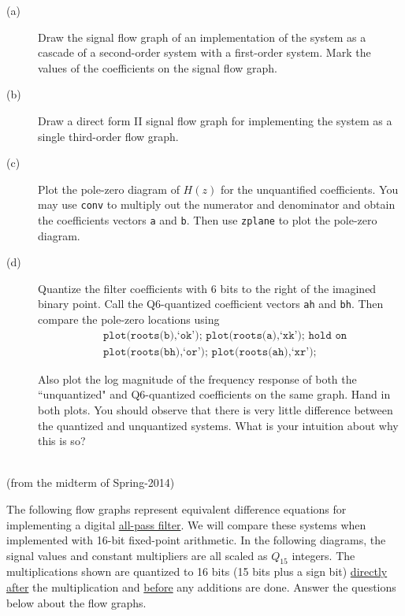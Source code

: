 \documentclass[12pt]{report}
\begin{document}
\begin{description}
	\item[(a)] Draw the signal flow graph of an implementation of the system as a cascade of a second-order system with a first-order system. Mark the values of the coefficients on the signal flow graph.
	\item[(b)] Draw a direct form II signal flow graph for implementing the system as a single third-order flow graph. 
	\item[(c)] Plot the pole-zero diagram of $H(z)$ for the unquantified coefficients. You may use \texttt{conv} to multiply out the numerator and denominator and obtain the coefficients vectors \texttt{a} and \texttt{b}. Then use \texttt{zplane} to plot the pole-zero diagram.
	\item[(d)] Quantize the filter coefficients with 6 bits to the right of the imagined binary point. Call the Q6-quantized coefficient vectors \texttt{ah} and \texttt{bh}. Then compare the pole-zero locations using
	\begin{align*}
		&\texttt{plot(roots(b),`ok');~plot(roots(a),`xk'); hold on} \\
		&\texttt{plot(roots(bh),`or');~plot(roots(ah),`xr');}
	\end{align*}
	
	Also plot the log magnitude of the frequency response of both the ``unquantized" and Q6-quantized coefficients on the same graph. Hand in both plots. You should observe that there is very little difference between the quantized and unquantized systems. What is your intuition about why this is so?
	
\end{description}

\mbox{}\\
\newpage
{} (from the midterm of Spring-2014)

The following flow graphs represent equivalent difference equations for implementing a digital \underline{all-pass filter}. We will compare these systems when implemented with 16-bit fixed-point arithmetic. In the following diagrams, the signal values and constant multipliers are all scaled as $Q_{15}$ integers. The multiplications shown are quantized to 16 bits (15 bits plus a sign bit) \underline{directly after} the multiplication and \underline{before} any additions are done. Answer the questions below about the flow graphs.

\begin{center}
	
\end{center}
\end{document}
